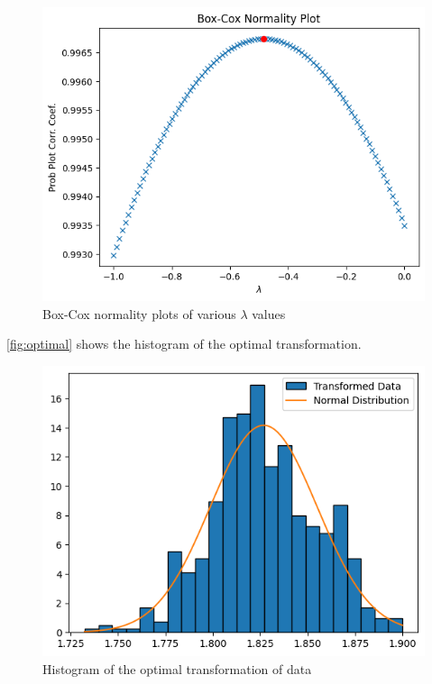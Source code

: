 \begin{figure}[!ht]
  \centering
  \includegraphics[width=.6\textwidth]{images/normality.png}
  \caption{Box-Cox normality plots of various $\lambda$ values}
  \label{fig:normality}
\end{figure}

\autoref{fig:optimal} shows the histogram of the optimal transformation.

\begin{figure}[!ht]
  \centering
  \includegraphics[width=.6\textwidth]{images/optimal-hist.png}
  \caption{Histogram of the optimal transformation of data}
  \label{fig:optimal}
\end{figure}
